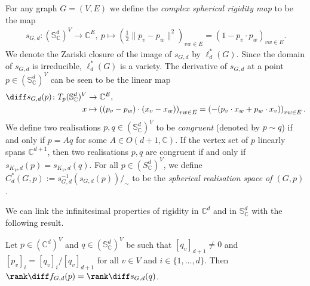 For any graph $G=(V,E)$ we define the \emph{complex spherical rigidity map} to be the map
\begin{align*}
	s_{G,d} \colon (\mathbb{S}_{\mathbb{C}}^{d})^{V} \rightarrow \mathbb{C}^{E}, ~ p \mapsto \left( \frac{1}{2}\|p_v-p_w\|^2 \right)_{vw \in E} =\left( 1 - p_v \cdot p_w\right)_{vw \in E}.
\end{align*}
We denote the Zariski closure of the image of $s_{G,d}$ by $\ell^*_d(G)$.
Since the domain of $s_{G,d}$ is irreducible,
$\ell_d^*(G)$ is a variety.
The derivative of $s_{G,d}$ at a point $p \in (\mathbb{S}_{\mathbb{C}}^{d})^{V}$ can be seen to be the linear map
\begin{align*}
	\diff s_{G,d}(p) \colon T_p (\mathbb{S}_{\mathbb{C}}^{d})^{V} &\rightarrow \mathbb{C}^{E},\\
	x &\mapsto \left( (p_v-p_w) \cdot (x_v-x_w) \right)_{vw \in E} = \left(-(p_v \cdot x_w + p_w \cdot x_v) \right)_{vw \in E}.
\end{align*}
We define two realisations $p,q \in (\mathbb{S}_{\mathbb{C}}^{d})^V$ to be \emph{congruent} (denoted by $p \sim q$) if and only if $p = Aq$ for some $A \in O(d+1, \mathbb{C})$.
If the vertex set of $p$ linearly spans $\mathbb{C}^{d+1}$,
then two realisations $p,q$ are congruent if and only if $s_{K_V,d}(p) = s_{K_V,d}(q)$.
For all $p \in (S_\mathbb{C}^{d})^V$,
we define $C^*_d(G,p) := s^{-1}_{G,d} (s_{G,d}(p))/_\sim$ to be the \emph{spherical realisation space of $(G,p)$}.


We can link the infinitesimal properties of rigidity in $\mathbb{C}^d$ and in $\mathbb{S}^d_\mathbb{C}$ with the following result.

\begin{lemma}\label{l:equivrank}
	Let $p \in (\mathbb{C}^{d})^V$ and $q \in (\mathbb{S}_{\mathbb{C}}^{d})^V$ be such that $[q_{v}]_{d+1} \neq 0$ and $[p_v]_i = [q_v]_i/[q_v]_{d+1}$ for all $v \in V$ and $i \in \{1,\ldots,d\}$.
	Then $\rank \diff f_{G,d}(p)= \rank \diff s_{G,d}(q)$.
\end{lemma}

